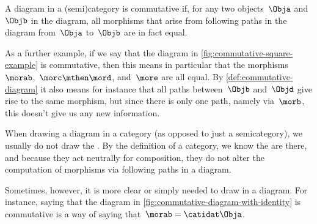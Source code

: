 \begin{marginfigure}
    \centering
    \caption{}
    \label{fig:commutative-diagram-example-prep}
\end{marginfigure}

\begin{marginfigure}
    \centering
    \caption{}
    \label{fig:commutative-diagram-example}
\end{marginfigure}

\begin{marginfigure}
    \centering
    \caption{}
    \label{fig:commutative-square-example}
\end{marginfigure}

\begin{marginfigure}
    \centering
    \caption{}
    \label{fig:commutative-diagram-with-identity}
\end{marginfigure}

\begin{definition}
    \label{def:commutative-diagram}
    A diagram in a (semi)category is commutative if, for any two objects~$\Obja$ and~$\Objb$ in the diagram, all morphisms that arise from following paths in the diagram from~$\Obja$ to~$\Objb$ are in fact equal.
\end{definition}

As a further example, if we say that the diagram in \cref{fig:commutative-square-example} is commutative, then this means in particular that the morphisms~$\morab$,~$\morc \mthen \mord$, and~$\more$ are all equal.
By \cref{def:commutative-diagram} it also means for instance that all paths between~$\Objb$ and~$\Objd$ give rise to the same morphism, but since there is only one path, namely via~$\morb$, this doesn't give us any new information.

\begin{remark}
    When drawing a diagram in a category (as opposed to just a semicategory), we usually do not draw the .
    By the definition of a category, we know the   are there, and because they act neutrally for composition, they do not alter the computation of morphisms via following paths in a diagram.

    Sometimes, however, it is more clear or simply needed to draw   in a diagram.
    For instance, saying that the diagram in \cref{fig:commutative-diagram-with-identity} is commutative is a way of saying that~$\morab = \catidat\Obja$.
\end{remark}


